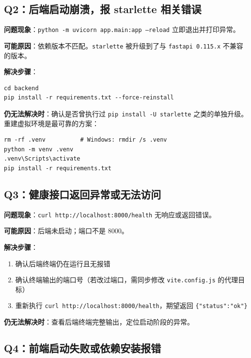 \documentclass[UTF8,a4paper,11pt]{ctexrep}
\begin{document}
\subsection{Q2：后端启动崩溃，报 starlette 相关错误}

\textbf{问题现象}：\texttt{python -m uvicorn app.main:app --reload} 立即退出并打印异常。

\textbf{可能原因}：依赖版本不匹配。\texttt{starlette} 被升级到了与 \texttt{fastapi 0.115.x} 不兼容的版本。

\textbf{解决步骤}：

\begin{Verbatim}[breaklines=true,breakanywhere=true,fontsize=\small,frame=single,framesep=4pt,rulecolor=\color{codeframe}]
cd backend
pip install -r requirements.txt --force-reinstall
\end{Verbatim}

\textbf{仍无法解决时}：确认是否曾执行过 \texttt{pip install -U starlette} 之类的单独升级。重建虚拟环境是最可靠的方案：

\begin{Verbatim}[breaklines=true,breakanywhere=true,fontsize=\small,frame=single,framesep=4pt,rulecolor=\color{codeframe}]
rm -rf .venv          # Windows: rmdir /s .venv
python -m venv .venv
.venv\Scripts\activate
pip install -r requirements.txt
\end{Verbatim}


\subsection{Q3：健康接口返回异常或无法访问}

\textbf{问题现象}：\texttt{curl http://localhost:8000/health} 无响应或返回错误。

\textbf{可能原因}：后端未启动；端口不是 8000。

\textbf{解决步骤}：

\begin{enumerate}
\item 确认后端终端仍在运行且无报错
\item 确认终端输出的端口号（若改过端口，需同步修改 \texttt{vite.config.js} 的代理目标）
\item 重新执行 \texttt{curl http://localhost:8000/health}，期望返回 \texttt{\{"status":"ok"\}}
\end{enumerate}
\textbf{仍无法解决时}：查看后端终端完整输出，定位启动阶段的异常。


\subsection{Q4：前端启动失败或依赖安装报错}
\end{document}

